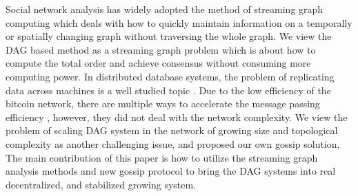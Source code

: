 Social network analysis has widely adopted the method of streaming graph computing \cite{ediger2011tracking, green2012fast, ediger2012stinger} which deals
with how to quickly maintain information on a temporally or spatially changing graph without traversing the whole graph. 
We view the DAG based method as a streaming graph problem which is about how to compute the total order and achieve consensus without consuming more computing power.
In distributed database systems, the problem of replicating data across machines is a well studied topic \cite{demers1988epidemic}.
Due to the low efficiency of the bitcoin network, there are multiple ways to accelerate the message passing efficiency \cite{klarmanbloxroute}, however, they did not deal with the network complexity. 
We view the problem of scaling DAG system in the network of growing size and topological complexity as another challenging issue, and proposed our own gossip solution.
The main contribution of this paper is how to utilize the streaming graph analysis methods and new gossip protocol to bring the DAG systems into real decentralized, and stabilized growing system.
